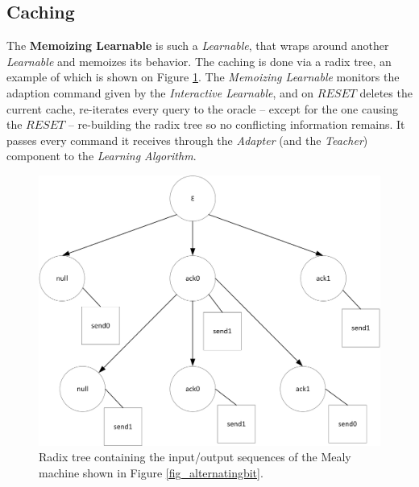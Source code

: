 \subsection{Caching} \label{subsec_memoization}

The \textbf{Memoizing Learnable} is such a \textit{Learnable}, that wraps around another \textit{Learnable} and memoizes its behavior. The caching is done via a radix tree, an example of which is shown on Figure \ref{fig_impl_radix_example}. The \textit{Memoizing Learnable} monitors the adaption command given by the \textit{Interactive Learnable}, and on $RESET$ deletes the current cache, re-iterates every query to the oracle -- except for the one causing the $RESET$ -- re-building the radix tree so no conflicting information remains. It passes every command it receives through the \textit{Adapter} (and the \textit{Teacher}) component to the \textit{Learning Algorithm}.

\begin{figure}[!ht] 
	\centering
	\includegraphics[width=120mm, keepaspectratio]{figures/impl_radix_example.png}
	\caption{Radix tree containing the input/output sequences of the Mealy machine shown in Figure \ref{fig_alternatingbit}.} 
	\label{fig_impl_radix_example}
\end{figure}